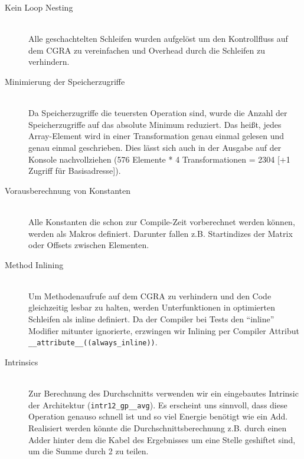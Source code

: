 \documentclass[oneside,11pt,accentcolor=tud2b, nochapname]{tudexercise}
\begin{document}
\begin{description}	
	\item[Kein Loop Nesting] \hfill \\
	Alle geschachtelten Schleifen wurden aufgelöst um den Kontrollfluss auf dem CGRA zu vereinfachen und Overhead durch die Schleifen zu verhindern.\\
	
	\item[Minimierung der Speicherzugriffe] \hfill \\
	Da Speicherzugriffe die teuersten Operation sind, wurde die Anzahl der Speicherzugriffe auf das absolute Minimum reduziert.
	Das heißt, jedes Array-Element wird in einer Transformation genau einmal gelesen und genau einmal geschrieben.
	Dies lässt sich auch in der Ausgabe auf der Konsole nachvollziehen (576 Elemente * 4 Transformationen = 2304 [+1 Zugriff für Basisadresse]).\\
	
	\item[Vorausberechnung von Konstanten] \hfill \\
	Alle Konstanten die schon zur Compile-Zeit vorberechnet werden können, werden als Makros definiert. 
	Darunter fallen z.B. Startindizes der Matrix oder Offsets zwischen Elementen.\\
	
	\item[Method Inlining] \hfill \\
	Um Methodenaufrufe auf dem CGRA zu verhindern und den Code gleichzeitig lesbar zu halten, werden Unterfunktionen in optimierten Schleifen als inline definiert.
	Da der Compiler bei Tests den "`inline"' Modifier mitunter ignorierte, erzwingen wir  Inlining per Compiler Attribut \texttt{\_\_attribute\_\_((always\_inline))}.\\
	
	\item[Intrinsics] \hfill \\
	Zur Berechnung des Durchschnitts verwenden wir ein eingebautes Intrinsic der Architektur (\texttt{intr12\_gp\_\_avg}).
	Es erscheint uns sinnvoll, dass diese Operation genauso schnell ist und so viel Energie benötigt wie ein Add.
	Realisiert werden könnte die Durchschnittsberechnung z.B. durch einen Adder hinter dem die Kabel des Ergebnisses um eine Stelle geshiftet sind, um die Summe durch 2 zu teilen.\\
	

\end{description}
\end{document}
